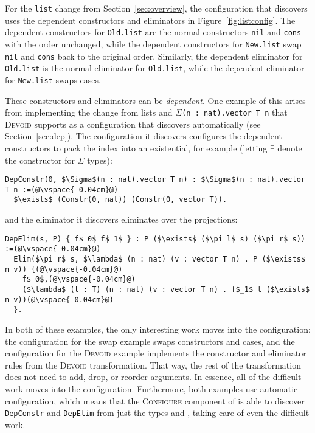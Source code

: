 For the \lstinline{list} change from Section~\ref{sec:overview},
the configuration that \toolname discovers uses the dependent constructors
and eliminators in Figure~\ref{fig:listconfig}. The dependent constructors for \lstinline{Old.list}
are the normal constructors \lstinline{nil} and \lstinline{cons} with the order unchanged,
while the dependent constructors for \lstinline{New.list} swap \lstinline{nil} and \lstinline{cons}
back to the original order.
Similarly, the dependent eliminator for \lstinline{Old.list} is the normal eliminator for \lstinline{Old.list},
while the dependent eliminator for \lstinline{New.list} swaps cases.

These constructors and eliminators can be \textit{dependent}.
One example of this arises from implementing the change from lists and $\Sigma$\lstinline{(n : nat).vector T n} that
\textsc{Devoid} supports as a configuration that \toolname discovers automatically (see Section~\ref{sec:dep}).
The configuration it discovers configures the dependent constructors to pack the index into an existential, for example (letting $\exists$ denote the constructor for $\Sigma$ types):

\begin{lstlisting}
DepConstr(0, $\Sigma$(n : nat).vector T n) : $\Sigma$(n : nat).vector T n :=(@\vspace{-0.04cm}@)
  $\exists$ (Constr(0, nat)) (Constr(0, vector T)).
\end{lstlisting}
and the eliminator it discovers eliminates over the projections:

\begin{lstlisting}
DepElim(s, P) { f$_0$ f$_1$ } : P ($\exists$ ($\pi_l$ s) ($\pi_r$ s)) :=(@\vspace{-0.04cm}@)
  Elim($\pi_r$ s, $\lambda$ (n : nat) (v : vector T n) . P ($\exists$ n v)) {(@\vspace{-0.04cm}@)
    f$_0$,(@\vspace{-0.04cm}@)
    ($\lambda$ (t : T) (n : nat) (v : vector T n) . f$_1$ t ($\exists$ n v))(@\vspace{-0.04cm}@)
  }. 
\end{lstlisting}

In both of these examples, the only interesting work moves into the configuration:
the configuration for the swap example swaps constructors and cases,
and the configuration for the \textsc{Devoid} example implements the constructor and eliminator rules from the \textsc{Devoid} transformation.
That way, the rest of the \toolname transformation does not need to add, drop, or reorder arguments.
In essence, all of the difficult work moves into the configuration.
Furthermore, both examples use automatic configuration, which means that the \textsc{Configure} component of \toolname is able to 
discover \lstinline{DepConstr} and \lstinline{DepElim} from just the types \A and \B, taking care of even the difficult work.

